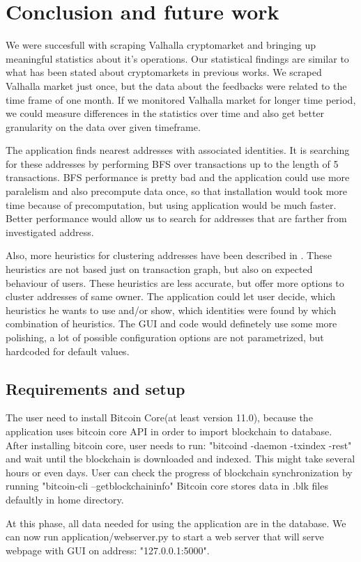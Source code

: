 \documentclass[
  digital, %
  table,   %
  lof,     %
  lot,     %
  oneside
]{fithesis3}
\begin{document}
\chapter{Conclusion and future work}

We were succesfull with scraping Valhalla cryptomarket and
bringing up meaningful statistics about it's operations.
Our statistical findings are similar to what has been stated about
cryptomarkets in previous works.
We scraped Valhalla market just once, but the data about the feedbacks were
related to the time frame of one month. If we monitored Valhalla market for longer time period,
we could measure differences in the statistics over time and also get better granularity
on the data over given timeframe.

The application finds nearest addresses with associated identities.
It is searching for these addresses by performing BFS over transactions up to the length of 5 transactions.
BFS performance is pretty bad and the application could use more paralelism and also precompute data once, so that
installation would took more time because of precomputation, but using application would be much faster.
Better performance would allow us to search for addresses that are farther from investigated address.

Also, more heuristics for clustering addresses have been described in 
\parencite{androulaki2013evaluating}. These heuristics are not based just on transaction graph, but also
on expected behaviour of users. These heuristics are less accurate, but 
offer more options to cluster addresses of same owner. The application could let user decide, which heuristics
he wants to use and/or show, which identities were found by which combination of heuristics.
The GUI and code would definetely use some more polishing, a lot of possible configuration options
are not parametrized, but hardcoded for default values.


\begin{appendices}
\chapter{Requirements and setup }

The user need to install Bitcoin Core(at least version 11.0), because 
the application uses bitcoin core API in order to import blockchain to database.
After installing bitcoin core, user needs to run:
"bitcoind -daemon -txindex -rest"
and wait until the blockchain is downloaded and indexed. This might take several hours or even days.
User can check the progress of blockchain synchronization by running
"bitcoin-cli --getblockchaininfo"
Bitcoin core stores data in .blk files defaultly in home directory.

At this phase, all data needed for using the application are in the database. We can now run application/webserver.py
to start a web server that will serve webpage with GUI on address: "127.0.0.1:5000".


\end{appendices}

\printbibliography
\end{document}
